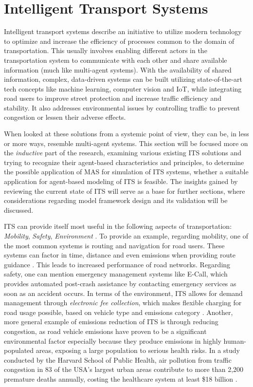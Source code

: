 \documentclass[0main.tex]{subfiles}
\begin{document}
\section{Intelligent Transport Systems}\label{sec-its}

Intelligent transport systems describe an initiative to utilize modern technology 
to optimize and increase the efficiency of processes common to the domain of transportation. 
This usually involves enabling different actors in the transportation system to communicate 
with each other and share available information (much like multi-agent systems). With the 
availability of shared information, complex, data-driven systems can be built utilizing 
state-of-the-art tech concepts like machine learning, computer vision and IoT, while
integrating road users to improve street protection and increase traffic efficiency and stability.
It also addresses environmental issues by controlling traffic to prevent congestion or lessen
their adverse effects. 

When looked at these solutions from a systemic point of view, they can 
be, in less or more ways, resemble multi-agent systems. This section will be focused more on 
the \emph{inductive} part of the research, examining various existing ITS solutions and trying 
to recognize their agent-based characteristics and principles, to determine the possible application 
of MAS for simulation of ITS systems, whether a suitable application for agent-based modeling of 
ITS is feasible. The insights gained by reviewing the current state of ITS will 
serve as a base for further sections, where considerations regarding model framework design and 
its validation will be discussed. 

ITS can provide itself most useful in the following aspects of transportation: 
\emph{Mobility}, \emph{Safety}, \emph{Environment} \cite{Lishchenko2021}. To provide an example, regarding mobility, 
one of the most common systems is routing and navigation for road users. These systems can 
factor in time, distance and even emissions when providing route guidance \cite{Firmin2006}. This leads to 
increased performance of road networks. Regarding safety, one can mention emergency management
systems like E-Call, which provides automated post-crash assistance by contacting emergency
services as soon as an accident occurs. In terms of the environment, 
ITS allows for demand management through \emph{electronic fee collection}, which makes flexible 
charging for road usage possible, based on vehicle type and emissions category \cite{Commision2022}.
Another, more general example of emissions reduction of ITS is through reducing congestion, as road vehicle 
emissions have proven to be a significant environmental factor especially because they produce emissions 
in highly human-populated areas, exposing a large population to serious health risks. In a study conducted by the Harvard
School of Public Health, air pollution from traffic congestion in 83 of the USA's largest urban
areas contribute to more than 2,200 premature deaths annually, costing the healthcare system at
least \$18 billion \cite{Levy2011}.
\end{document}
